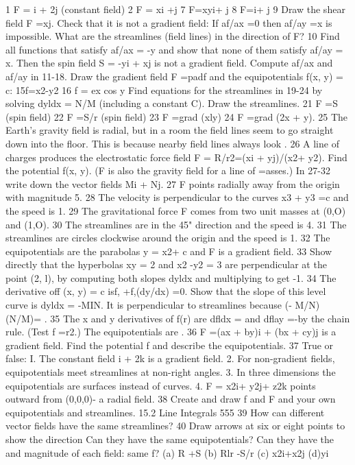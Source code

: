 1 F = i + 2j (constant field) 2 F = xi +j
7 F=xyi+ j 8 F=i+ j
9 Draw the shear field F =xj. Check that it is not a gradient
field: If af/ax =0 then af/ay =x is impossible. What are the
streamlines (field lines) in the direction of F?
10 Find all functions that satisfy af/ax = -y and show that
none of them satisfy af/ay = x. Then the spin field S =
-yi + xj is not a gradient field.
Compute af/ax and af/ay in 11-18. Draw the gradient field
F =padf and the equipotentials f(x, y) = c:
15f=x2-y2 16 f = ex cos y
Find equations for the streamlines in 19-24 by solving dyldx =
N/M (including a constant C). Draw the streamlines.
21 F =S (spin field) 22 F =S/r (spin field)
23 F =grad (xly) 24 F =grad (2x + y).
25 The Earth's gravity field is radial, but in a room the field
lines seem to go straight down into the floor. This is because
nearby field lines always look .
26 A line of charges produces the electrostatic force field F =
R/r2=(xi + yj)/(x2+ y2). Find the potential f(x, y). (F is also
the gravity field for a line of =asses.)
In 27-32 write down the vector fields Mi + Nj.
27 F points radially away from the origin with magnitude 5.
28 The velocity is perpendicular to the curves x3 + y3 =c and
the speed is 1.
29 The gravitational force F comes from two unit masses at
(0,O) and (1,O).
30 The streamlines are in the 45" direction and the speed is 4.
31 The streamlines are circles clockwise around the origin
and the speed is 1.
32 The equipotentials are the parabolas y = x2+ c and F is
a gradient field.
33 Show directly that the hyperbolas xy = 2 and x2 -y2 = 3
are perpendicular at the point (2, l), by computing both slopes
dyldx and multiplying to get -1.
34 The derivative off (x, y) = c isf, +f,(dy/dx) =0. Show that
the slope of this level curve is dyldx = -MIN. It is perpendicular
to streamlines because (- M/N)(N/M)= .
35 The x and y derivatives of f(r) are dfldx = and
dflay =-by the chain rule. (Test f =r2.) The equipotentials
are .
36 F =(ax + by)i + (bx + cy)j is a gradient field. Find the
potential f and describe the equipotentials.
37 True or false:
I. The constant field i + 2k is a gradient field.
2. For non-gradient fields, equipotentials meet streamlines
at non-right angles.
3. In three dimensions the equipotentials are surfaces
instead of curves.
4. F = x2i+ y2j+ z2k points outward from (0,0,0)-
a radial field.
38 Create and draw f and F and your own equipotentials
and streamlines. 
15.2 Line Integrals 555
39 How can different vector fields have the same streamlines? 40 Draw arrows at six or eight points to show the direction
Can they have the same equipotentials? Can they have the and magnitude of each field:
same f? (a) R +S (b) Rlr -S/r (c) x2i+x2j (d)yi

